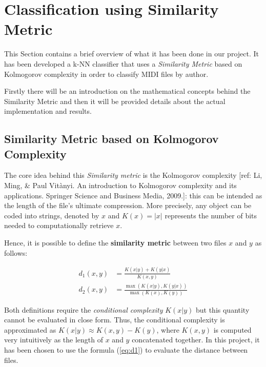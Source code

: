 \documentclass[a4paper]{article}
\begin{document}
	
	\section{Classification using Similarity Metric}
	\lettrine[nindent=0em,lines=2]{T}{}his Section contains a brief overview of what it has been done in our project. It has been developed a k-NN classifier that uses a  \textit{Similarity Metric} based on Kolmogorov complexity in order to classify MIDI files by author. 
	
	Firstly there will be an introduction on the mathematical concepts behind the Similarity Metric and then it will be provided details about the actual implementation and results.
	
	\subsection{Similarity Metric based on Kolmogorov Complexity}
	The core idea behind this \textit{Similarity metric} is the Kolmogorov complexity [ref: Li, Ming, \& Paul Vit\`{a}nyi. An introduction to Kolmogorov complexity and its applications. Springer Science and Business Media, 2009.]: this can be intended as the length of the file's ultimate compression. More precisely, any object can be coded into strings, denoted by $x$ and $K(x) = |x|$ represents the number of bits needed to computationally retrieve $x$.
	
	Hence, it is possible to define the \textbf{similarity metric} between two files $x$ and $y$ as follows:
	
	\begin{align}
		\label{eq:d1}
		d_1(x,y) &= \frac{K(x|y) + K(y|x)}{K(x,y)} \\
		\label{eq:d2}
		d_2(x,y) &= \frac{\max{\left(K(x|y),K(y|x)\right)}}{\max{\left(K(x),K(y)\right)}}
	\end{align}
	
	Both definitions require the \textit{conditional complexity} $K(x|y)$ but this quantity cannot be evaluated in close form. Thus, the conditional complexity is approximated as $K(x|y) \approx K(x,y) - K(y)$, where $K(x,y)$ is computed very intuitively as the length of $x$ and $y$ concatenated together. In this project, it has been chosen to use the formula (\ref{eq:d1}) to evaluate the distance between files.
\end{document}
